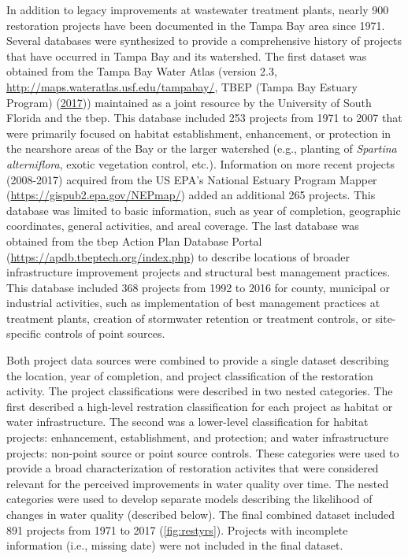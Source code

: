\documentclass[]{article}
\begin{document}
In addition to legacy improvements at wastewater treatment plants,
nearly 900 restoration projects have been documented in the Tampa Bay
area since 1971. Several databases were synthesized to provide a
comprehensive history of projects that have occurred in Tampa Bay and
its watershed. The first dataset was obtained from the Tampa Bay Water
Atlas (version 2.3, \url{http://maps.wateratlas.usf.edu/tampabay/}, TBEP
(Tampa Bay Estuary Program) (\protect\hyperlink{ref-TBEP17}{2017}))
maintained as a joint resource by the University of South Florida and
the \ac{tbep}. This database included 253 projects from 1971 to 2007
that were primarily focused on habitat establishment, enhancement, or
protection in the nearshore areas of the Bay or the larger watershed
(e.g., planting of \emph{Spartina alterniflora}, exotic vegetation
control, etc.). Information on more recent projects (2008-2017) acquired
from the US EPA's National Estuary Program Mapper
(\url{https://gispub2.epa.gov/NEPmap/}) added an additional 265
projects. This database was limited to basic information, such as year
of completion, geographic coordinates, general activities, and areal
coverage. The last database was obtained from the \ac{tbep} Action Plan
Database Portal (\url{https://apdb.tbeptech.org/index.php}) to describe
locations of broader infrastructure improvement projects and structural
best management practices. This database included 368 projects from 1992
to 2016 for county, municipal or industrial activities, such as
implementation of best management practices at treatment plants,
creation of stormwater retention or treatment controls, or site-specific
controls of point sources.

Both project data sources were combined to provide a single dataset
describing the location, year of completion, and project classification
of the restoration activity. The project classifications were described
in two nested categories. The first described a high-level restration
classification for each project as habitat or water infrastructure. The
second was a lower-level classification for habitat projects:
enhancement, establishment, and protection; and water infrastructure
projects: non-point source or point source controls. These categories
were used to provide a broad characterization of restoration activites
that were considered relevant for the perceived improvements in water
quality over time. The nested categories were used to develop separate
models describing the likelihood of changes in water quality (described
below). The final combined dataset included 891 projects from 1971 to
2017 (\cref{fig:restyrs}). Projects with incomplete information (i.e.,
missing date) were not included in the final dataset.
\end{document}
